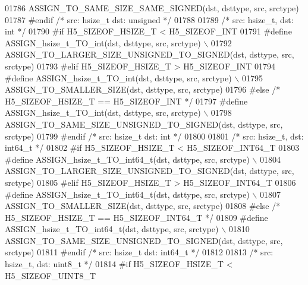 \begin{DoxyCode}
01786 \textcolor{preprocessor}{        ASSIGN\_TO\_SAME\_SIZE\_SAME\_SIGNED(dst, dsttype, src, srctype)}
01787 \textcolor{preprocessor}{#endif }\textcolor{comment}{/* src: hsize\_t dst: unsigned */}\textcolor{preprocessor}{}
01788 
01789 \textcolor{comment}{/* src: hsize\_t, dst: int */}
01790 \textcolor{preprocessor}{#if H5\_SIZEOF\_HSIZE\_T < H5\_SIZEOF\_INT}
01791 \textcolor{preprocessor}{    #define ASSIGN\_hsize\_t\_TO\_int(dst, dsttype, src, srctype) \(\backslash\)}
01792 \textcolor{preprocessor}{        ASSIGN\_TO\_LARGER\_SIZE\_UNSIGNED\_TO\_SIGNED(dst, dsttype, src, srctype)}
01793 \textcolor{preprocessor}{#elif H5\_SIZEOF\_HSIZE\_T > H5\_SIZEOF\_INT}
01794 \textcolor{preprocessor}{    #define ASSIGN\_hsize\_t\_TO\_int(dst, dsttype, src, srctype) \(\backslash\)}
01795 \textcolor{preprocessor}{        ASSIGN\_TO\_SMALLER\_SIZE(dst, dsttype, src, srctype)}
01796 \textcolor{preprocessor}{#else }\textcolor{comment}{/* H5\_SIZEOF\_HSIZE\_T == H5\_SIZEOF\_INT */}\textcolor{preprocessor}{}
01797 \textcolor{preprocessor}{    #define ASSIGN\_hsize\_t\_TO\_int(dst, dsttype, src, srctype) \(\backslash\)}
01798 \textcolor{preprocessor}{        ASSIGN\_TO\_SAME\_SIZE\_UNSIGNED\_TO\_SIGNED(dst, dsttype, src, srctype)}
01799 \textcolor{preprocessor}{#endif }\textcolor{comment}{/* src: hsize\_t dst: int */}\textcolor{preprocessor}{}
01800 
01801 \textcolor{comment}{/* src: hsize\_t, dst: int64\_t */}
01802 \textcolor{preprocessor}{#if H5\_SIZEOF\_HSIZE\_T < H5\_SIZEOF\_INT64\_T}
01803 \textcolor{preprocessor}{    #define ASSIGN\_hsize\_t\_TO\_int64\_t(dst, dsttype, src, srctype) \(\backslash\)}
01804 \textcolor{preprocessor}{        ASSIGN\_TO\_LARGER\_SIZE\_UNSIGNED\_TO\_SIGNED(dst, dsttype, src, srctype)}
01805 \textcolor{preprocessor}{#elif H5\_SIZEOF\_HSIZE\_T > H5\_SIZEOF\_INT64\_T}
01806 \textcolor{preprocessor}{    #define ASSIGN\_hsize\_t\_TO\_int64\_t(dst, dsttype, src, srctype) \(\backslash\)}
01807 \textcolor{preprocessor}{        ASSIGN\_TO\_SMALLER\_SIZE(dst, dsttype, src, srctype)}
01808 \textcolor{preprocessor}{#else }\textcolor{comment}{/* H5\_SIZEOF\_HSIZE\_T == H5\_SIZEOF\_INT64\_T */}\textcolor{preprocessor}{}
01809 \textcolor{preprocessor}{    #define ASSIGN\_hsize\_t\_TO\_int64\_t(dst, dsttype, src, srctype) \(\backslash\)}
01810 \textcolor{preprocessor}{        ASSIGN\_TO\_SAME\_SIZE\_UNSIGNED\_TO\_SIGNED(dst, dsttype, src, srctype)}
01811 \textcolor{preprocessor}{#endif }\textcolor{comment}{/* src: hsize\_t dst: int64\_t */}\textcolor{preprocessor}{}
01812 
01813 \textcolor{comment}{/* src: hsize\_t, dst: uint8\_t */}
01814 \textcolor{preprocessor}{#if H5\_SIZEOF\_HSIZE\_T < H5\_SIZEOF\_UINT8\_T}

\end{DoxyCode}
